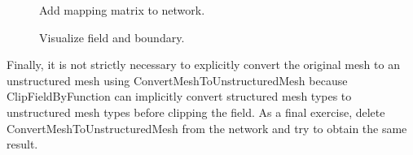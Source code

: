\documentclass[fleqn,11pt,openany]{book}
\begin{document}
\begin{figure}[H]
\caption{Add mapping matrix to network.}
\label{fig:highlightmods}
\end{figure}

\begin{figure}[H]
\caption{Visualize field and boundary.}
\label{fig:viewbound}
\end{figure}

Finally, it is not strictly necessary to explicitly convert the original mesh to an unstructured mesh using ConvertMeshToUnstructuredMesh because ClipFieldByFunction can implicitly convert structured mesh types to unstructured mesh types before clipping the field.
As a final exercise, delete ConvertMeshToUnstructuredMesh from the network and try to obtain the same result.
\end{document}
